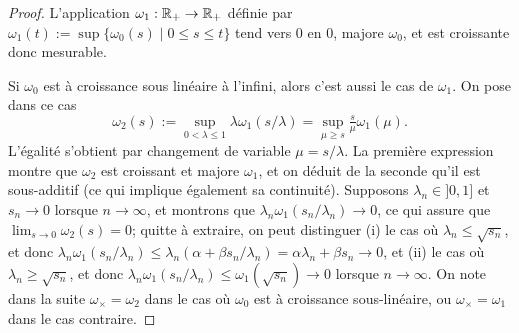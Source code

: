 \begin{proof}
	L'application $\omega_1 : \mathbb{R}_+ \to \mathbb{R}_+$ définie par $\omega_1(t) := \sup\{\omega_0(s) \mid 0 \leq s \leq t\}$ tend vers $0$ en $0$, majore $\omega_0$, et est croissante donc mesurable. 
	
	Si $\omega_0$ est à croissance sous linéaire à l'infini, alors c'est aussi le cas de $\omega_1$. On pose dans ce cas 
	\begin{equation}
		\omega_2(s) := \sup_{0 < \lambda \leq 1} \lambda \omega_1(s/\lambda) 
		= \sup_{\mu \geq s} \tfrac s \mu \omega_1(\mu). 
	\end{equation}
	L'égalité s'obtient par changement de variable $\mu = s/\lambda$. 
	La première expression montre que $\omega_2$ est croissant et majore $\omega_1$, et on déduit de la seconde qu'il est sous-additif (ce qui implique également sa continuité). 
	Supposons $\lambda_n \in ]0,1]$ et $s_n \to 0$ lorsque $n\to \infty$, et montrons que $\lambda_n \omega_1(s_n/\lambda_n) \to 0$, ce qui assure que $\lim_{s \to 0} \omega_2(s) = 0$; quitte à extraire, on peut distinguer (i) le cas où $\lambda_n \leq \sqrt{s_n}$, et donc $\lambda_n \omega_1(s_n/\lambda_n) \leq \lambda_n (\alpha + \beta s_n/\lambda_n) = \alpha \lambda_n + \beta s_n \to 0$, et (ii) le cas où $\lambda_n \geq \sqrt{s_n}$, et donc $\lambda_n \omega_1(s_n/\lambda_n) \leq \omega_1(\sqrt {s_n}) \to 0$ lorsque $n \to \infty$. 
	On note dans la suite $\omega_\times = \omega_2$ dans le cas où $\omega_0$ est à croissance sous-linéaire, ou $\omega_\times = \omega_1$ dans le cas contraire.
	
	
	

\end{proof}
